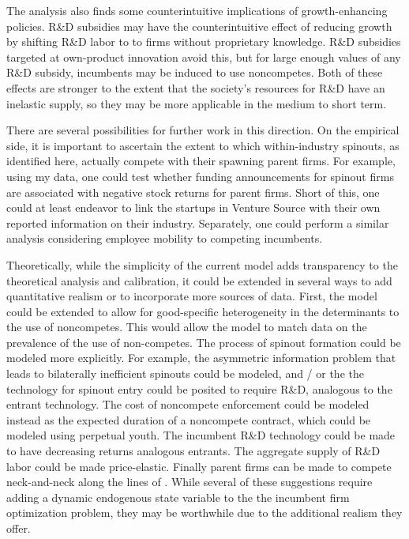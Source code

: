\documentclass[11pt,english]{article}
\begin{document}
The analysis also finds some counterintuitive implications of growth-enhancing policies. R\&D subsidies may have the counterintuitive effect of reducing growth by shifting R\&D labor to to firms without proprietary knowledge. R\&D subsidies targeted at own-product innovation avoid this, but for large enough values of any R\&D subsidy, incumbents may be induced to use noncompetes. Both of these effects are stronger to the extent that the society's resources for R\&D have an inelastic supply, so they may be more applicable in the medium to short term.

There are several possibilities for further work in this direction. On the empirical side, it is important to ascertain the extent to which within-industry spinouts, as identified here, actually compete with their spawning parent firms. For example, using my data, one could test whether funding announcements for spinout firms are associated with negative stock returns for parent firms. Short of this, one could at least endeavor to link the startups in Venture Source with their own reported information on their industry. Separately, one could perform a similar analysis considering employee mobility to competing incumbents. 

Theoretically, while the simplicity of the current model adds transparency to the theoretical analysis and calibration, it could be extended in several ways to add quantitative realism or to incorporate more sources of data. First, the model could be extended to allow for good-specific heterogeneity in the determinants to the use of noncompetes. This would allow the model to match data on the prevalence of the use of non-competes. The process of spinout formation could be modeled more explicitly. For example, the asymmetric information problem that leads to bilaterally inefficient spinouts could be modeled, and / or the the technology for spinout entry could be posited to require R\&D, analogous to the entrant technology. The cost of noncompete enforcement could be modeled instead as the expected duration of a noncompete contract, which could be modeled using perpetual youth. The incumbent R\&D technology could be made to have decreasing returns analogous entrants. The aggregate supply of R\&D labor could be made price-elastic. Finally parent firms can be made to compete neck-and-neck along the lines of \cite{aghion_competition_2005}. While several of these suggestions require adding a dynamic endogenous state variable to the the incumbent firm optimization problem, they may be worthwhile due to the additional realism they offer.
 
\end{document}
